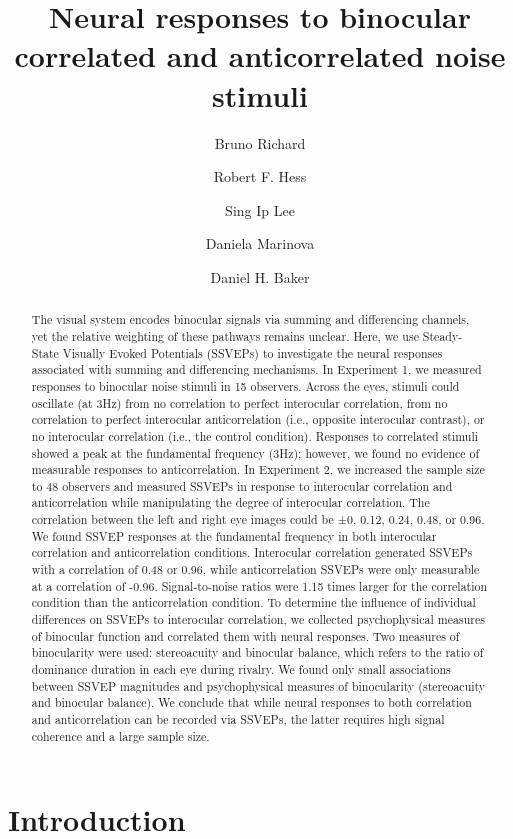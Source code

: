 \documentclass[
  12pt,
]{article}
\title{Neural responses to binocular correlated and anticorrelated noise
stimuli}
\author[1]{Bruno Richard}
\author[2]{Robert F. Hess}
\author[3]{Sing Ip Lee}
\author[3]{Daniela Marinova}
\author[3]{Daniel H. Baker}
\affil[1]{Department of Mathematics and Computer Science, Rutgers
University, Newark, New Jersey, USA}
\affil[2]{Department of Ophthalmology, McGill University,
Montreal, Qc, Canada}
\affil[3]{Department of Psychology, University of York, York, UK}
\date{}
\begin{document}
\maketitle
\begin{abstract}
The visual system encodes binocular signals via summing and differencing
channels, yet the relative weighting of these pathways remains unclear.
Here, we use Steady-State Visually Evoked Potentials (SSVEPs) to
investigate the neural responses associated with summing and
differencing mechanisms. In Experiment 1, we measured responses to
binocular noise stimuli in 15 observers. Across the eyes, stimuli could
oscillate (at 3Hz) from no correlation to perfect interocular
correlation, from no correlation to perfect interocular anticorrelation
(i.e., opposite interocular contrast), or no interocular correlation
(i.e., the control condition). Responses to correlated stimuli showed a
peak at the fundamental frequency (3Hz); however, we found no evidence
of measurable responses to anticorrelation. In Experiment 2, we
increased the sample size to 48 observers and measured SSVEPs in
response to interocular correlation and anticorrelation while
manipulating the degree of interocular correlation. The correlation
between the left and right eye images could be ±0, 0.12, 0.24, 0.48, or
0.96. We found SSVEP responses at the fundamental frequency in both
interocular correlation and anticorrelation conditions. Interocular
correlation generated SSVEPs with a correlation of 0.48 or 0.96, while
anticorrelation SSVEPs were only measurable at a correlation of -0.96.
Signal-to-noise ratios were 1.15 times larger for the correlation
condition than the anticorrelation condition. To determine the influence
of individual differences on SSVEPs to interocular correlation, we
collected psychophysical measures of binocular function and correlated
them with neural responses. Two measures of binocularity were used:
stereoacuity and binocular balance, which refers to the ratio of
dominance duration in each eye during rivalry. We found only small
associations between SSVEP magnitudes and psychophysical measures of
binocularity (stereoacuity and binocular balance). We conclude that
while neural responses to both correlation and anticorrelation can be
recorded via SSVEPs, the latter requires high signal coherence and a
large sample size.
\end{abstract}


\section{Introduction}\label{introduction}
\end{document}
